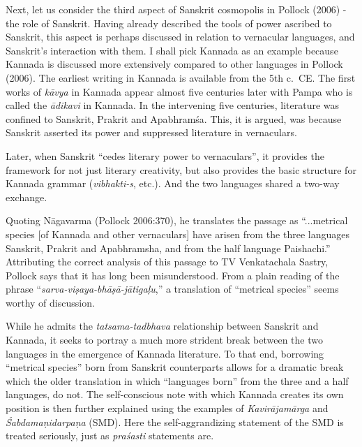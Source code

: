 Next, let us consider the third aspect of Sanskrit cosmopolis in Pollock (2006) - the role of Sanskrit. Having already described the tools of power ascribed to Sanskrit, this aspect is perhaps discussed in relation to vernacular languages, and Sanskrit’s interaction with them. I shall pick Kannada as an example because Kannada is discussed more extensively compared to other languages in Pollock (2006). The earliest writing in Kannada is available from the 5th c.\ CE. The first works of {\sl kāvya} in Kannada appear almost five centuries later with Pampa who is called the {\sl ādikavi} in Kannada. In the intervening five centuries, literature was confined to Sanskrit, Prakrit and Apabhramśa. This, it is argued, was because Sanskrit asserted its power and suppressed literature in vernaculars.

Later, when Sanskrit “cedes literary power to vernaculars”, it provides the framework for not just literary creativity, but also provides the basic structure for Kannada grammar ({\sl vibhakti-s}, etc.). And the two languages shared a two-way exchange. 

Quoting Nāgavarma (Pollock 2006:370), he translates the passage as “...metrical species [of Kannada and other vernaculars] have arisen from the three languages Sanskrit, Prakrit and Apabhramsha, and from the half language Paishachi.” Attributing the correct analysis of this passage to TV Venkatachala Sastry, Pollock says that it has long been misunderstood. From a plain reading of the phrase “{\sl sarva-viṣaya-bhāṣā-jātigaḷu},” a translation of “metrical species” seems worthy of discussion. 

While he admits the {\sl tatsama-tadbhava} relationship between Sanskrit and Kannada, it seeks to portray a much more strident break between the two languages in the emergence of Kannada literature. To that end, borrowing “metrical species” born from Sanskrit counterparts allows for a dramatic break which the older translation in which “languages born” from the three and a half languages, do not. The self-conscious note with which Kannada creates its own position is then further explained using the examples of {\sl Kavirājamārga} and {\sl Śabdamaṇidarpaṇa} (SMD). Here the self-aggrandizing statement of the SMD is treated seriously, just as {\sl praśasti} statements are. 

